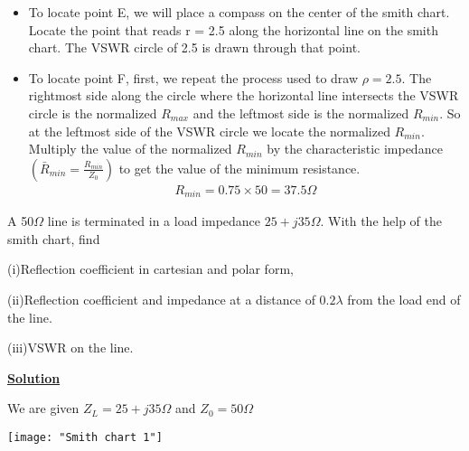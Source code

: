 \begin{itemize}
	\item 
   To locate point E, we will place a compass on the center of the smith chart. Locate the point that reads r = 2.5 along the horizontal line on the smith chart. The VSWR circle of 2.5 is drawn through that point.
	
	\item 
   To locate point F, first, we repeat the process used to draw $\rho = 2.5$. The rightmost side along the circle where the horizontal line intersects the VSWR circle is the normalized $R_{max}$ and the leftmost side is the normalized $R_{min}$. So at the leftmost side of the VSWR circle we locate the normalized $R_{min}$. Multiply the value of the normalized $R_{min}$ by the characteristic impedance$(\bar{R}_{min} = \frac{R_{min}}{Z_0})$ to get the value of the minimum resistance.
   	\begin{align*}
   	R_{min}  = 0.75 \times 50 = 37.5\Omega
   	\end{align*}
\end{itemize}

\begin{example}
	A 50$\Omega$ line is terminated in a load impedance  $25+j35\Omega$. With the help of the smith chart, find 
	
	(i)Reflection coefficient in cartesian and polar form,
	
	(ii)Reflection coefficient and impedance at a distance of $0.2\lambda$ from the load end of the line.
	
	(iii)VSWR on the line.
\end{example}

\begin{center}
	\textbf{\underline{\large Solution}}
\end{center}
We are given $Z_{L}=25+j35\Omega$ and $Z_{0}=50\Omega$

\begin{center}
	\texttt{[image: "Smith chart 1"]}
\end{center}


